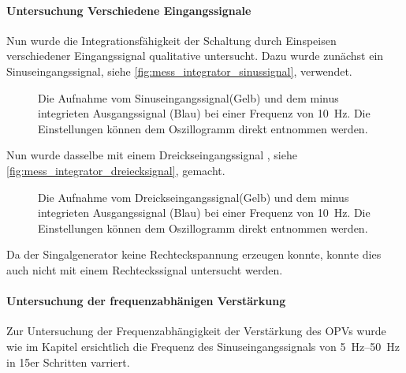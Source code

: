 \documentclass[12pt,english,ngerman]{scrartcl}
\begin{document}
\paragraph{Untersuchung Verschiedene Eingangssignale}
Nun wurde die Integrationsfähigkeit der Schaltung durch Einspeisen
verschiedener Eingangssignal qualitative untersucht. Dazu wurde zunächst ein
Sinuseingangssignal, siehe \autoref{fig:mess_integrator_sinussignal}, verwendet.
 
\begin{figure}[H]
  \centering
  \caption{Die Aufnahme vom Sinuseingangssignal(Gelb) und dem minus integrieten
  Ausgangssignal (Blau) bei einer Frequenz von \SI{10}{\hertz}. Die
  Einstellungen können dem Oszillogramm direkt entnommen werden.}
  \label{fig:mess_integrator_sinussignal}
\end{figure}

Nun wurde dasselbe mit einem Dreickseingangssignal
, siehe \autoref{fig:mess_integrator_dreiecksignal}, gemacht.

\begin{figure}[H]
  \centering
  \caption{Die Aufnahme vom Dreickseingangssignal(Gelb) und dem minus integrieten
  Ausgangssignal (Blau) bei einer Frequenz von \SI{10}{\hertz}. Die
  Einstellungen können dem Oszillogramm direkt entnommen werden.}
  \label{fig:mess_integrator_dreiecksignal}
\end{figure}

Da der Singalgenerator \cite{funktionsgenerator} keine Rechteckspannung erzeugen konnte, konnte
dies auch nicht mit einem Rechteckssignal untersucht werden.


\paragraph{Untersuchung der frequenzabhänigen Verstärkung}
Zur Untersuchung der Frequenzabhängigkeit der Verstärkung des OPVs wurde wie im
Kapitel  ersichtlich die Frequenz des
Sinuseingangssignals von \SIrange{5}{50}{\hertz} in 15er Schritten varriert.
\end{document}
